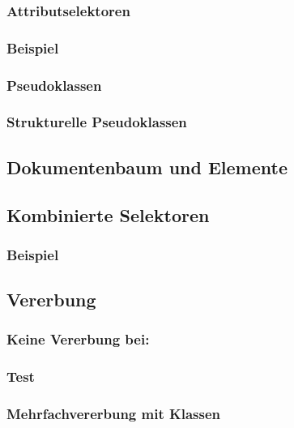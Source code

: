 \subsubsection{Attributselektoren}
\subsubsection*{Beispiel}
\subsubsection{Pseudoklassen}
\subsubsection*{Strukturelle Pseudoklassen}

\subsection{Dokumentenbaum und Elemente}

\subsection{Kombinierte Selektoren}
\subsubsection*{Beispiel}

\subsection{Vererbung}
\subsubsection*{Keine Vererbung bei:}
\subsubsection*{Test}

\subsubsection{Mehrfachvererbung mit Klassen}

